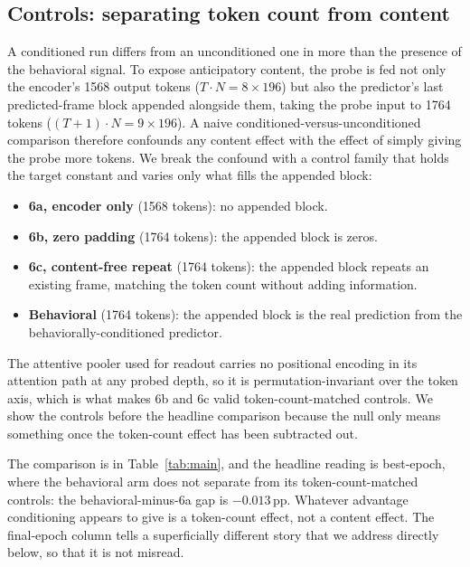 \subsection{Controls: separating token count from content}
\label{subsec:controls}

A conditioned run differs from an unconditioned one in more than the presence of
the behavioral signal. To expose anticipatory content, the probe is fed not only
the encoder's \num{1568} output tokens ($T\cdot N = 8\times196$) but also the
predictor's last predicted-frame block appended alongside them, taking the probe
input to \num{1764} tokens ($(T{+}1)\cdot N = 9\times196$). A naive
conditioned-versus-unconditioned comparison therefore confounds any content
effect with the effect of simply giving the probe more tokens. We break the
confound with a control family that holds the target constant and varies only
what fills the appended block:
\begin{itemize}
  \item \textbf{6a, encoder only} (\num{1568} tokens): no appended block.
  \item \textbf{6b, zero padding} (\num{1764} tokens): the appended block is zeros.
  \item \textbf{6c, content-free repeat} (\num{1764} tokens): the appended block
        repeats an existing frame, matching the token count without adding
        information.
  \item \textbf{Behavioral} (\num{1764} tokens): the appended block is the real
        prediction from the behaviorally-conditioned predictor.
\end{itemize}
The attentive pooler used for readout carries no positional encoding in its
attention path at any probed depth, so it is permutation-invariant over the token
axis, which is what makes 6b and 6c valid token-count-matched controls. We show
the controls before the headline comparison because the null only means something
once the token-count effect has been subtracted out.

The comparison is in Table~\ref{tab:main}, and the headline reading is best-epoch,
where the behavioral arm does not separate from its token-count-matched controls:
the behavioral-minus-6a gap is $-0.013$\,pp. Whatever advantage conditioning
appears to give is a token-count effect, not a content effect. The final-epoch
column tells a superficially different story that we address directly below, so
that it is not misread.

